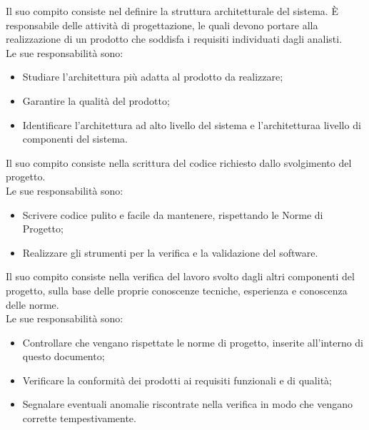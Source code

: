 
            Il suo compito consiste nel definire la struttura architetturale del sistema.
            È responsabile delle attività di progettazione, le quali devono portare alla realizzazione di un prodotto che soddisfa i requisiti individuati dagli analisti.\\
            Le sue responsabilità sono:
            \begin{itemize}
                \item Studiare l'architettura più adatta al prodotto da realizzare;
                \item Garantire la qualità del prodotto;
                \item Identificare l'architettura ad alto livello del sistema e l'architetturaa livello di componenti del sistema.
            \end{itemize}


            Il suo compito consiste nella scrittura del codice richiesto dallo svolgimento del progetto. \\
            Le sue responsabilità sono:
            \begin{itemize}
                \item Scrivere codice pulito e facile da mantenere, rispettando le Norme di Progetto;
                \item Realizzare gli strumenti per la verifica e la validazione del software.
            \end{itemize}

            Il suo compito consiste nella verifica del lavoro svolto dagli altri componenti del progetto, sulla base delle proprie conoscenze tecniche, esperienza e conoscenza delle norme. \\
            Le sue responsabilità sono:
            \begin{itemize}
                \item Controllare che vengano rispettate le norme di progetto, inserite all'interno di questo documento;
                \item Verificare la conformità dei prodotti ai requisiti funzionali e di qualità;
                \item Segnalare eventuali anomalie riscontrate nella verifica in modo che vengano corrette tempestivamente.
            \end{itemize}


